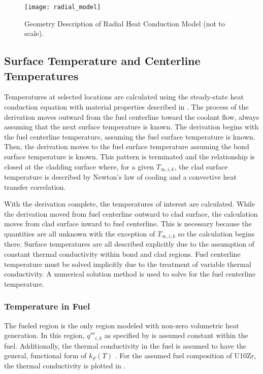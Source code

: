     \begin{figure}
      \centering
      \texttt{[image: radial\_model]}
      \caption{Geometry Description of Radial Heat Conduction Model (not to
        scale).}
      \label{fig:radial_model}
    \end{figure}

  \subsection{Surface Temperature and Centerline Temperatures}
    \label{sec:surface_temps}
    Temperatures at selected locations are calculated using the steady-state
    heat conduction equation with material properties described in
    . The process of the derivation moves outward
    from the fuel centerline toward the coolant flow, always assuming that the
    next surface temperature is known. The derivation begins with the fuel 
    centerline temperature, assuming the fuel surface temperature is known. 
    Then, the derivation moves to the fuel surface temperature assuming the bond 
    surface temperature is known. This pattern is terminated and the 
    relationship is closed at the cladding surface where, for a given 
    $T_{\infty,i,k}$, the clad surface temperature is described by Newton's law 
    of cooling and a convective heat transfer correlation. 

    With the derivation complete, the temperatures of interest are calculated.
    While the derivation moved from fuel centerline outward to clad surface,
    the calculation moves from clad surface inward to fuel centerline. This is
    necessary because the quantities are all unknown with the exception of
    $T_{\infty,i,k}$ so the calculation begins there. Surface temperatures are
    all described explicitly due to the assumption of constant thermal
    conductivity within bond and clad regions. Fuel centerline temperature must
    be solved implicitly due to the treatment of variable thermal conductivity.
    A numerical solution method is used to solve for the fuel centerline
    temperature.
    
    \subsubsection{Temperature in Fuel}
      \label{sec:temperature_in_fuel}
      The fueled region is the only region modeled with non-zero volumetric heat
      generation. In this region, $q'''_{i,k}$ as specified by
       is assumed constant within the fuel.
      Additionally, the thermal conductivity in the fuel is assumed to have the
      general, functional form of $k_F(T)$ \cite{fuelProp}. For the assumed
      fuel composition of U10Zr, the thermal conductivity is plotted in
      .

